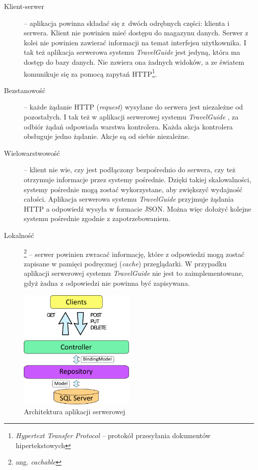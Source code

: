 \documentclass[a4paper]{book}
\newcommand{\appName}{\emph{TravelGuide} }
\begin{document}
			\begin{description}
				
				\item[Klient-serwer] -- aplikacja powinna składać się z~dwóch odrębnych części: klienta i serwera. Klient nie powinien mieć dostępu do magazynu danych. Serwer z kolei nie powinien zawierać informacji na temat interfejsu użytkownika. I tak też aplikacja serwerowa systemu \appName jest jedyną, która ma dostęp do bazy danych. Nie zawiera ona żadnych widoków, a ze światem 				komunikuje się za pomocą zapytań HTTP\footnote{\emph{Hypertext Transfer Protocol} – protokół przesyłania dokumentów hipertekstowych}.
				\item[Bezstanowość] -- każde żądanie HTTP (\emph{request}) wysyłane do serwera jest niezależne od pozostałych. I tak też w aplikacji serwerowej systemu \appName, za odbiór żądań odpowiada warstwa kontrolera. Każda akcja kontrolera obsługuje jedno żądanie. Akcje są od siebie niezależne.
				\item[Wielowarstwowość] -- klient nie wie, czy jest podłączony bezpośrednio do serwera, czy też otrzymuje informacje przez systemy pośrednie. Dzięki takiej skalowalności, systemy pośrednie mogą zostać wykorzystane, aby zwiększyć wydajność całości. Aplikacja serwerowa systemu \appName przyjmuje żądania HTTP a odpowiedź wysyła w formacie JSON. Można więc dołożyć kolejne systemu pośrednie zgodnie z zapotrzebowaniem. 
				\item[Lokalność]\footnote{ang. \textit{cachable}} -- serwer powinien zwracać informację, które z odpowiedzi mogą zostać zapisane w pamięci podręcznej (\emph{cache}) przeglądarki. W przypadku aplikacji serwerowej systemu \appName nie jest to zaimplementowane, gdyż żadna z odpowiedzi nie powinna być zapisywana.
				
			\end{description}
			
			\begin{figure}
							\centering
							\includegraphics[width=0.5\textwidth]{images/architektura_server.pdf}
							\caption{Architektura aplikacji serwerowej}
							\label{fig:architektura_server}
		    \end{figure}
						
\end{document}
